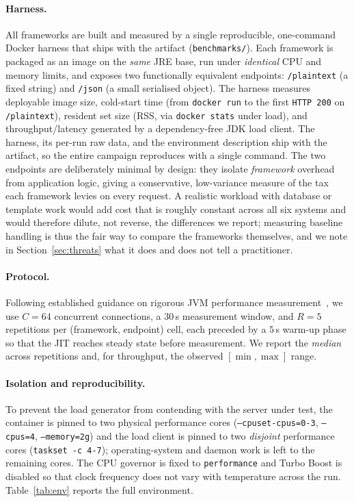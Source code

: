 \paragraph{Harness.} All frameworks are built and measured by a single
reproducible, one-command Docker harness that ships with the artifact
(\texttt{benchmarks/}). Each framework is packaged as an image on the
\emph{same} JRE base, run under \emph{identical} CPU and memory limits,
and exposes two functionally equivalent endpoints: \texttt{/plaintext}
(a fixed string) and \texttt{/json} (a small serialised object). The
harness measures deployable image size, cold-start time (from
\texttt{docker run} to the first \texttt{HTTP 200} on \texttt{/plaintext}),
resident set size (RSS, via \texttt{docker stats} under load), and
throughput/latency generated by a dependency-free JDK load client. The
harness, its per-run raw data, and the environment description ship
with the artifact, so the entire campaign reproduces with a single
command. The two endpoints are deliberately minimal by design: they
isolate \emph{framework} overhead from application logic, giving a
conservative, low-variance measure of the tax each framework levies on
every request. A realistic workload with database or template work
would add cost that is roughly constant across all six systems and
would therefore dilute, not reverse, the differences we report;
measuring baseline handling is thus the fair way to compare the
frameworks themselves, and we note in Section~\ref{sec:threats} what it
does and does not tell a practitioner.

\paragraph{Protocol.} Following established guidance on rigorous JVM
performance measurement~\cite{georges2007,kalibera2013}, we use $C=64$
concurrent connections, a $30$\,s measurement window, and $R=5$
repetitions per (framework, endpoint) cell, each preceded by a $5$\,s
warm-up phase so that the JIT reaches steady state before measurement.
We report the \emph{median} across repetitions and, for throughput, the
observed $[\min,\max]$ range.

\paragraph{Isolation and reproducibility.} To prevent the load
generator from contending with the server under test, the container is
pinned to two physical performance cores
(\texttt{--cpuset-cpus=0-3}, \texttt{--cpus=4}, \texttt{--memory=2g})
and the load client is pinned to two \emph{disjoint} performance cores
(\texttt{taskset -c 4-7}); operating-system and daemon work is left to
the remaining cores. The CPU governor is fixed to \texttt{performance}
and Turbo Boost is disabled so that clock frequency does not vary with
temperature across the run. Table~\ref{tab:env} reports the full
environment.

